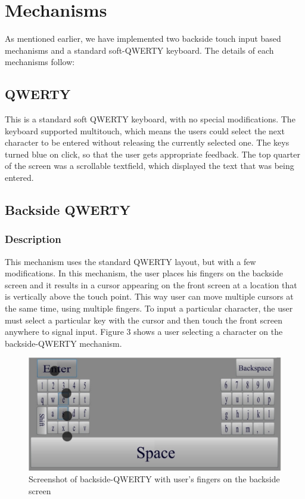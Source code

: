 \section{Mechanisms}

As mentioned earlier, we have implemented two backside touch input based mechanisms and a standard soft-QWERTY keyboard. The details of each mechanisms follow:

\subsection{QWERTY}

This is a standard soft QWERTY keyboard, with no special modifications. The keyboard supported multitouch, which means the users could select the next character to be entered without releasing the currently selected one. The keys turned blue on click, so that the user gets appropriate feedback. The top quarter of the screen was a scrollable textfield, which displayed the text that was being entered.

\subsection{Backside QWERTY}
\subsubsection{Description}

This mechanism uses the standard QWERTY layout, but with a few modifications. In this mechanism, the user places his fingers on the backside screen and it results in a cursor appearing on the front screen at a location that is vertically above the touch point. This way user can move multiple cursors at the same time, using multiple
fingers. To input a particular character, the user must select a particular key with the cursor and then touch the front screen anywhere to signal input. Figure 3 shows a user selecting a character on the backside-QWERTY mechanism.

\begin{figure}
    \includegraphics[scale=0.45]{Figures/backside.pdf} 
    \caption{Screenshot of backside-QWERTY with user's fingers on the
      backside screen}
\end{figure}

